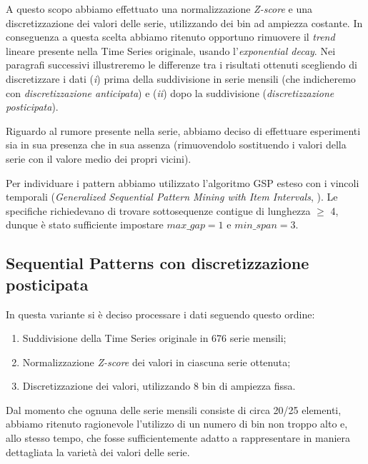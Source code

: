 \documentclass[a4paper]{article}
\begin{document}
A questo scopo abbiamo effettuato una normalizzazione \textit{Z-score} e una discretizzazione dei valori delle serie, utilizzando dei bin ad ampiezza costante. In conseguenza a questa scelta abbiamo ritenuto opportuno rimuovere il \textit{trend} lineare presente nella Time Series originale, usando l'\textit{exponential decay}. Nei paragrafi successivi illustreremo le differenze tra i risultati ottenuti scegliendo di discretizzare i dati (\textit{i}) prima della suddivisione in serie mensili (che indicheremo con \textit{discretizzazione anticipata}) e (\textit{ii}) dopo la suddivisione (\textit{discretizzazione posticipata}).

Riguardo al rumore presente nella serie, abbiamo deciso di effettuare esperimenti sia in sua presenza che in sua assenza (rimuovendolo sostituendo i valori della serie con il valore medio dei propri vicini).

Per individuare i pattern abbiamo utilizzato l'algoritmo GSP esteso con i vincoli temporali (\textit{Generalized Sequential Pattern Mining with Item Intervals}, \cite{hirate}). Le specifiche richiedevano di trovare sottosequenze contigue di lunghezza $\geq$ 4, dunque è stato sufficiente impostare $max\_gap = 1$ e $min\_span = 3$.

\subsection{Sequential Patterns con discretizzazione posticipata}

In questa variante si è deciso processare i dati seguendo questo ordine:

\begin{enumerate}
	\item Suddivisione della Time Series originale in 676 serie mensili;
	\item Normalizzazione \textit{Z-score} dei valori in ciascuna serie ottenuta;
	\item Discretizzazione dei valori, utilizzando 8 bin di ampiezza fissa.
\end{enumerate}

Dal momento che ognuna delle serie mensili consiste di circa 20/25 elementi, abbiamo ritenuto ragionevole l'utilizzo di un numero di bin non troppo alto e, allo stesso tempo, che fosse sufficientemente adatto a rappresentare in maniera dettagliata la varietà dei valori delle serie.
\end{document}

